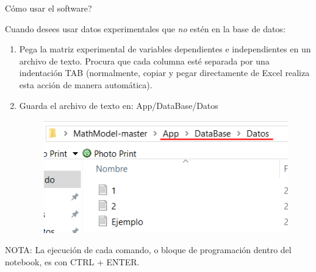 \begin{frame}[t]{C\'omo usar el software?}\vspace{10pt}

Cuando desees usar datos experimentales que \textit{no} est\'en en la base de datos:

\begin{enumerate}
	\item Pega la matriz experimental de variables dependientes e independientes en un archivo de texto. Procura que cada columna est\'e separada por una indentaci\'on TAB (normalmente, copiar y pegar directamente de Excel realiza esta acci\'on de manera autom\'atica).
	\item Guarda el archivo de texto en: App/DataBase/Datos
	\begin{figure}
		\includegraphics[scale=0.7]{Images/db.png}
	\end{figure}
\end{enumerate}

\vspace{0.5cm}

NOTA: La ejecuci\'on de cada comando, o bloque de programaci\'on dentro del notebook, es con CTRL + ENTER.

\end{frame}